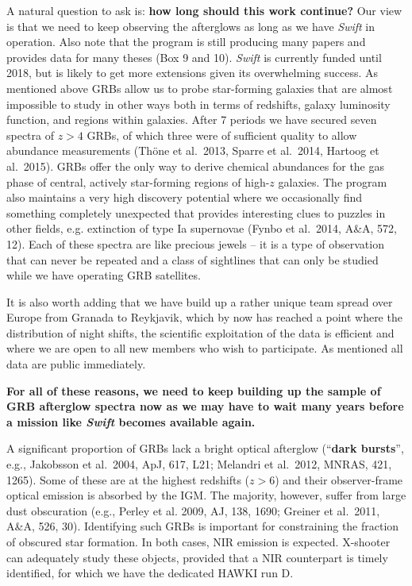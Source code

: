 \vspace{0.2cm}
A natural question to ask is: {\bf how long should this work continue?} Our
view is that we need to keep observing the afterglows as long as we have
\textit{Swift} in operation. Also note that the program is still producing many 
papers and provides data for many theses (Box 9 and 10). \textit{Swift} is currently 
funded until 2018, but is likely to get more extensions given its overwhelming 
success. As
mentioned above GRBs allow us to probe star-forming galaxies that are almost
impossible to study in other ways both in terms of redshifts, galaxy luminosity
function, and regions within galaxies. After 7 periods we have 
secured seven spectra of $z>4$ GRBs, of which three were of sufficient quality to
allow abundance measurements (Th\"one et al.\ 2013, Sparre et al.\ 2014, 
Hartoog et al.\ 2015). GRBs offer the only way to derive chemical abundances 
for the gas phase of central, actively star-forming regions of high-$z$ galaxies. 
The program also maintains a very high discovery
potential where we occasionally find something completely unexpected that 
provides interesting clues to puzzles in other fields, e.g. extinction of 
type Ia supernovae (Fynbo et al.\ 2014, A\&A, 572, 12). Each of these spectra are like
precious jewels – it is a type of observation that can never be repeated and a
class of sightlines that can only be studied while we have operating GRB
satellites. 

It is also worth adding that we have build up a rather unique team spread over
Europe from Granada to Reykjavik, which by now has reached a point where the 
distribution of night shifts, the scientific exploitation of the data is 
efficient and where we are open to all new members who wish to participate.
As mentioned all data are public immediately.

{\bf For all of these reasons, we need to keep
	building up the sample of GRB afterglow spectra now as we may have to wait many
	years before a mission like \textit{Swift} becomes available again.}

A significant proportion of GRBs lack a bright optical afterglow (``{\bf dark bursts}'', e.g.,
Jakobsson et al.\ 2004, ApJ, 617, L21; Melandri et al.\ 2012, MNRAS, 421, 1265). 
Some of these are at the highest
redshifts ($z > 6$) and their observer-frame optical emission is absorbed by
the IGM. The majority, however, suffer from large dust obscuration (e.g., Perley
et al. 2009, AJ, 138, 1690; Greiner et al.\ 2011, A\&A, 526, 30).
Identifying such GRBs is important for
constraining the fraction of obscured star formation. In both cases,
NIR emission is
expected. X-shooter
can adequately study these objects, provided that a NIR counterpart is timely
identified, for which we have the dedicated HAWKI run D. 

